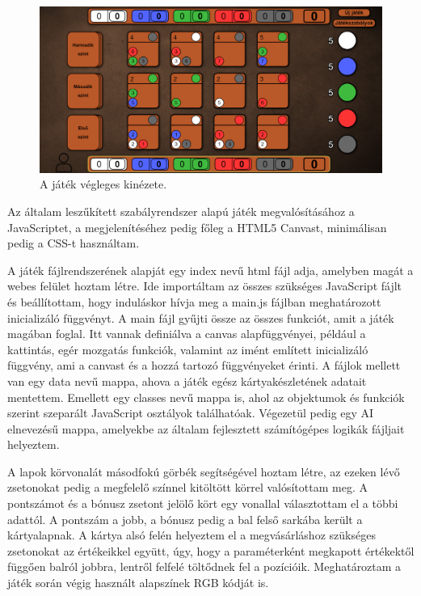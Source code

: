 \begin{figure}[h]
\centering
\includegraphics[scale=0.3]{images/screen_structure.png}
\caption{A játék végleges kinézete.}
\label{fig:screen_structure}
\end{figure}



Az általam leszűkített szabályrendszer alapú játék megvalósításához a JavaScriptet, a megjelenítéséhez pedig főleg a HTML5 Canvast, minimálisan pedig a CSS-t használtam.


A játék fájlrendszerének alapját egy index nevű html fájl adja, amelyben magát a webes felület hoztam létre. Ide importáltam az összes szükséges JavaScript fájlt és beállítottam, hogy induláskor hívja meg a main.js fájlban meghatározott inicializáló függvényt. A main fájl gyűjti össze az összes funkciót, amit a játék magában foglal. Itt vannak definiálva a canvas alapfüggvényei, például a kattintás, egér mozgatás funkciók, valamint az imént említett inicializáló függvény, ami a canvast és a hozzá tartozó függvényeket érinti. A fájlok mellett van egy data nevű mappa, ahova a játék egész kártyakészletének adatait mentettem. Emellett egy classes nevű mappa is, ahol az objektumok és funkciók szerint szeparált JavaScript osztályok találhatóak. Végezetül pedig egy AI elnevezésű mappa, amelyekbe az általam fejlesztett számítógépes logikák fájljait helyeztem.



A lapok körvonalát másodfokú görbék segítségével hoztam létre, az ezeken lévő zsetonokat pedig a megfelelő színnel kitöltött körrel valósítottam meg. A pontszámot és a bónusz zsetont jelölő kört egy vonallal választottam el a többi adattól. A pontszám a jobb, a bónusz pedig a bal felső sarkába került a kártyalapnak. A kártya alsó felén helyeztem el a megvásárláshoz szükséges zsetonokat az értékeikkel együtt, úgy, hogy a paraméterként megkapott értékektől függően balról jobbra, lentről felfelé töltődnek fel a pozícióik. Meghatároztam a játék során végig használt alapszínek RGB kódját is.


